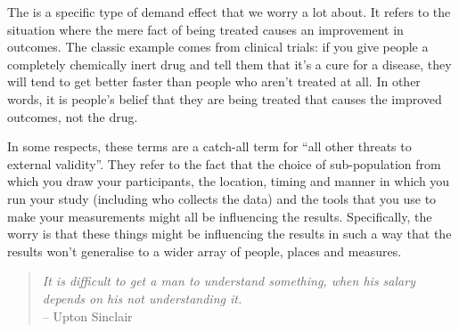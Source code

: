 

The  is a specific type of demand effect that we worry a lot about. It refers to the situation where the mere fact of being treated causes an improvement in outcomes. The classic example comes from clinical trials: if you give people a completely chemically inert drug and tell them that it's a cure for a disease, they will tend to get better faster than people who aren't treated at all. In other words, it is people's belief that they are being treated that causes the improved outcomes, not the drug.

 
In some respects, these terms are a catch-all term for ``all other threats to external validity''. They refer to the fact that the choice of sub-population from which you draw your participants, the location, timing and manner in which you run your study (including who collects the data) and the tools that you use to make your measurements might all be influencing the results. Specifically, the worry is that these things might be influencing the results in such a way that the results won't generalise to a wider array of people, places and measures. 
 

\begin{quote}
{\it It is difficult to get a man to understand something, when his salary depends on his not understanding it.}\\
\hspace*{2cm}-- Upton Sinclair
\end{quote}

